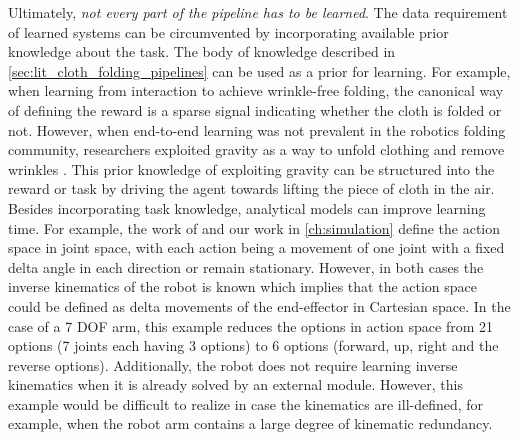 \documentclass[\home/main.tex]{subfiles}
\begin{document}
Ultimately, \emph{not every part of the pipeline has to be learned}.
The data requirement of learned systems can be circumvented by incorporating available prior knowledge about the task. The body of knowledge described in \cref{sec:lit_cloth_folding_pipelines} can be used as a prior for learning. For example, when learning from interaction to achieve wrinkle-free folding, the canonical way of defining the reward is a sparse signal indicating whether the cloth is folded or not. However, when end-to-end learning was not prevalent in the robotics folding community, researchers exploited gravity as a way to unfold clothing and remove wrinkles \autocite{Doumanoglou2016,Maitin2010}. This prior knowledge of exploiting gravity can be structured into the reward or task by driving the agent towards lifting the piece of cloth in the air.
Besides incorporating task knowledge, analytical models can improve learning time. For example, the work of \textcite{Zhang2015} and our work in \cref{ch:simulation} define the action space in joint space, with each action being a movement of one joint with a fixed delta angle in each direction or remain stationary. However, in both cases the inverse kinematics of the robot is known which implies that the action space could be defined as delta movements of the end-effector in Cartesian space. In the case of a 7 \gls{DOF} arm, this example reduces the options in action space from 21 options (7 joints each having 3 options) to 6 options (forward, up, right and the reverse options). Additionally, the robot does not require learning inverse kinematics when it is already solved by an external module. However, this example would be difficult to realize in case the kinematics are ill-defined, for example, when the robot arm contains a large degree of kinematic redundancy. 
\end{document}
